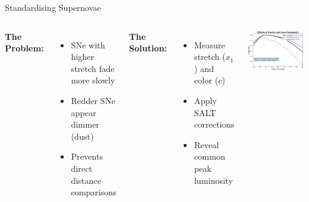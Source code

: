 \documentclass[aspectratio=169]{beamer}
\begin{document}
\begin{frame}{Standardising Supernovae}
  \begin{center}
  \end{center}
  \vfill
  \begin{columns}
    \scriptsize
    \textbf{The Problem:}
    \begin{itemize}
      \item SNe with higher stretch fade more slowly
      \item Redder SNe appear dimmer (dust)
      \item Prevents direct distance comparisons
    \end{itemize}
    \vspace{0.3cm}
    \textbf{The Solution:}
    \begin{itemize}
      \item Measure stretch ($x_1$) and color ($c$)
      \item Apply SALT corrections
      \item Reveal common peak luminosity
    \end{itemize}
    \centering
    \includegraphics[width=0.9\textwidth]{images/stretch_color_effects_plot.png}
  \end{columns}
\end{frame}
\end{document}
